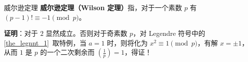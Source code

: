 
\begin{theorem}{威尔逊定理}
\textbf{威尔逊定理（Wilson 定理）}指，对于一个素数 $p$ 有 $(p-1)! \equiv -1 \pmod p$。
\end{theorem}
\textbf{证明}：对于 $2$ 显然成立。否则对于奇素数 $p$，对 Legendre 符号中的\autoref{the_legnnt_1}~取特例，当 $a=1$ 时，则将化为 $x^2 \equiv 1 \pmod p$，有解 $x = \pm 1$，从而 $1$ 是 $p$ 的一个二次剩余而 $\left(\frac 1p\right)=1$，得证！

